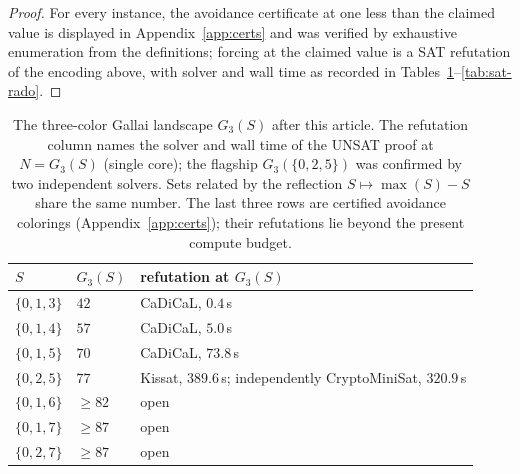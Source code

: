 \documentclass[12pt]{article}
\begin{document}
\begin{proof}
For every instance, the avoidance certificate at one less than the
claimed value is displayed in Appendix~\ref{app:certs} and was
verified by exhaustive enumeration from the definitions; forcing at
the claimed value is a SAT refutation of the encoding above, with
solver and wall time as recorded in
Tables~\ref{tab:sat-g3}--\ref{tab:sat-rado}.
\end{proof}

\begin{table}[ht]
\centering
\caption{The three-color Gallai landscape $G_{3}(S)$ after this
article. The refutation column names the solver and wall time of the
UNSAT proof at $N=G_{3}(S)$ (single core); the flagship
$G_{3}(\{0,2,5\})$ was confirmed by two independent solvers. Sets
related by the reflection $S\mapsto\max(S)-S$ share the same number.
The last three rows are certified avoidance colorings
(Appendix~\ref{app:certs}); their refutations lie beyond the present
compute budget.}
\label{tab:sat-g3}
\begin{tabular}{@{}lll@{}}
\toprule
$S$ & $G_{3}(S)$ & refutation at $G_{3}(S)$\\
\midrule
$\{0,1,3\}$ & $42$ & CaDiCaL, $0.4$\,s\\
$\{0,1,4\}$ & $57$ & CaDiCaL, $5.0$\,s\\
$\{0,1,5\}$ & $70$ & CaDiCaL, $73.8$\,s\\
$\{0,2,5\}$ & $77$ & Kissat, $389.6$\,s; independently CryptoMiniSat, $320.9$\,s\\
$\{0,1,6\}$ & $\ge 82$ & open\\
$\{0,1,7\}$ & $\ge 87$ & open\\
$\{0,2,7\}$ & $\ge 87$ & open\\
\bottomrule
\end{tabular}
\end{table}
\end{document}
